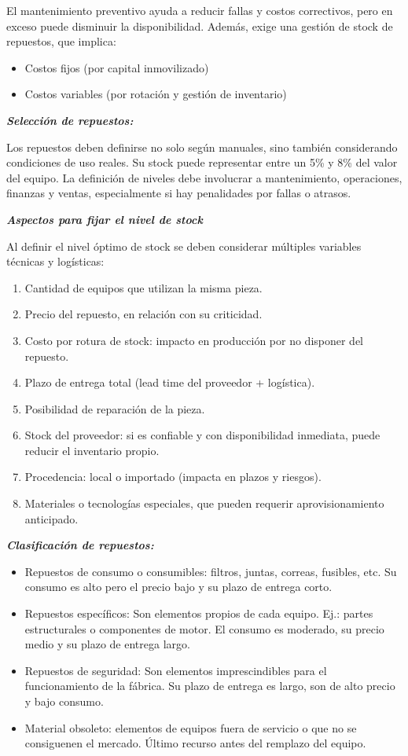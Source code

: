 \documentclass[a4paper,oneside,11pt]{article}
\begin{document}
El mantenimiento preventivo ayuda a reducir fallas y costos correctivos, pero en exceso puede disminuir la disponibilidad. Además, exige una gestión de stock de repuestos, que implica:

\begin{itemize}
    \item Costos fijos (por capital inmovilizado)
    \item Costos variables (por rotación y gestión de inventario)
\end{itemize}

\textbf{\textit{Selección de repuestos:}}

Los repuestos deben definirse no solo según manuales, sino también considerando condiciones de uso reales. Su stock puede representar entre un 5\% y 8\% del valor del equipo. La definición de niveles debe involucrar a mantenimiento, operaciones, finanzas y ventas, especialmente si hay penalidades por fallas o atrasos.


\textbf{\textit{Aspectos para fijar el nivel de stock}}

Al definir el nivel óptimo de stock se deben considerar múltiples variables técnicas y logísticas:
\begin{enumerate}
    \item Cantidad de equipos que utilizan la misma pieza.
    \item Precio del repuesto, en relación con su criticidad.
    \item Costo por rotura de stock: impacto en producción por no disponer del repuesto.
    \item Plazo de entrega total (lead time del proveedor + logística).
    \item Posibilidad de reparación de la pieza.
    \item Stock del proveedor: si es confiable y con disponibilidad inmediata, puede reducir el inventario propio.
    \item Procedencia: local o importado (impacta en plazos y riesgos).
    \item Materiales o tecnologías especiales, que pueden requerir aprovisionamiento anticipado.
\end{enumerate}

\textbf{\textit{Clasificación de repuestos:}}

\begin{itemize}
    \item Repuestos de consumo o consumibles: filtros, juntas, correas, fusibles, etc. Su consumo es alto pero el precio bajo y su plazo de entrega corto.
    \item Repuestos específicos: Son elementos propios de cada equipo. Ej.: partes
    estructurales o componentes de motor. El consumo es moderado, su precio medio y su plazo de entrega largo.
    \item Repuestos de seguridad: Son elementos imprescindibles para el funcionamiento de la fábrica. Su plazo de entrega es largo, son de alto precio y bajo consumo.
    \item Material obsoleto: elementos de equipos fuera de servicio o que no se consiguenen el mercado. Último recurso antes del remplazo del equipo.
\end{itemize}
\end{document}
